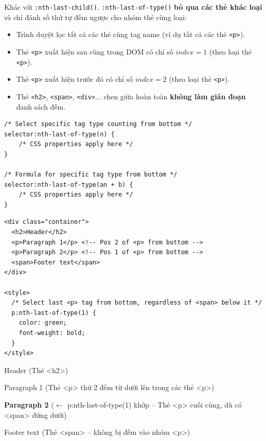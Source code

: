 \documentclass[11pt,oneside]{book}
\newcommand{\codeinline}[1]{\textcolor{accentOrange}{\texttt{#1}}}
\begin{document}
\begin{conceptBox}
Khác với \codeinline{:nth-last-child()}, \codeinline{:nth-last-of-type()} \textbf{bỏ qua các thẻ khác loại} và chỉ đánh số thứ tự đếm ngược cho nhóm thẻ cùng loại:
\begin{itemize}[leftmargin=1.5em, itemsep=2pt, parsep=0pt]
    \item Trình duyệt lọc tất cả các thẻ cùng tag name (ví dụ tất cả các thẻ \codeinline{<p>}).
    \item Thẻ \codeinline{<p>} xuất hiện sau cùng trong DOM có chỉ số $index = 1$ (theo loại thẻ \codeinline{<p>}).
    \item Thẻ \codeinline{<p>} xuất hiện trước đó có chỉ số $index = 2$ (theo loại thẻ \codeinline{<p>}).
    \item Thẻ \codeinline{<h2>}, \codeinline{<span>}, \codeinline{<div>}... chen giữa hoàn toàn \textbf{không làm gián đoạn} danh sách đếm.
\end{itemize}
\end{conceptBox}

\begin{codeWindow}
\begin{lstlisting}[language=CSS3]
/* Select specific tag type counting from bottom */
selector:nth-last-of-type(n) {
    /* CSS properties apply here */
}

/* Formula for specific tag type from bottom */
selector:nth-last-of-type(an + b) {
    /* CSS properties apply here */
}
\end{lstlisting}
\end{codeWindow}

\begin{codeWindow}
\begin{lstlisting}[language=HTML5]
<div class="container">
  <h2>Header</h2>
  <p>Paragraph 1</p> <!-- Pos 2 of <p> from bottom -->
  <p>Paragraph 2</p> <!-- Pos 1 of <p> from bottom -->
  <span>Footer text</span>
</div>

<style>
  /* Select last <p> tag from bottom, regardless of <span> below it */
  p:nth-last-of-type(1) {
    color: green;
    font-weight: bold;
  }
</style>
\end{lstlisting}
\end{codeWindow}

\begin{browserWindow}
\sffamily\small
Header {\scriptsize\textcolor{gray!60}{(Thẻ <h2>)}} \par\vspace{2pt}
Paragraph 1 {\scriptsize\textcolor{gray!60}{(Thẻ <p> thứ 2 đếm từ dưới lên trong các thẻ <p>)}} \par\vspace{2pt}
\textcolor{green!70!black}{\textbf{Paragraph 2}} {\scriptsize\textcolor{gray!60}{($\leftarrow$ p:nth-last-of-type(1) khớp -- Thẻ <p> cuối cùng, dù có <span> đứng dưới)}} \par\vspace{2pt}
Footer text {\scriptsize\textcolor{gray!60}{(Thẻ <span> -- không bị đếm vào nhóm <p>)}}
\end{browserWindow}
\end{document}
